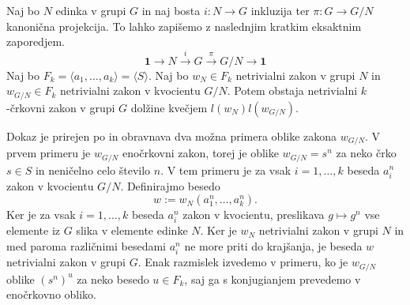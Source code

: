 \begin{lema}\label{lem_razsiritvena_lema}
    Naj bo $N$ edinka v grupi $G$ in naj bosta $i : N \to G$ inkluzija ter $\pi : G \to G / N$ kanonična projekcija. To lahko zapišemo z naslednjim kratkim eksaktnim zaporedjem. \begin{equation*}
        \mathbf{1} \to N \xrightarrow{i} G \xrightarrow{\pi} G / N \to  \mathbf{1}  
    \end{equation*}  
    Naj bo $F_k = \langle a_1, \ldots, a_k \rangle  = \langle S \rangle$. Naj bo $w_N \in F_k$ netrivialni zakon v grupi $N$ in $w_{ G / N} \in  F_k$ netrivialni zakon v kvocientu $G / N$. 
    Potem obstaja netrivialni $k$-črkovni zakon v grupi $G$ dolžine kvečjem $l(w_N) l( w_{ G / N } )$.
\end{lema}
\begin{dokaz}
    Dokaz je prirejen po \cite[str.~10]{Schneider_2016} in obravnava dva možna primera oblike zakona $w_{ G / N }$. 
     V prvem primeru je $w_{ G / N }$ enočrkovni zakon, torej je oblike $w_{G / N} = s^{n}$ za neko črko $s \in S$ in neničelno celo število $n$. V tem primeru je za vsak $i = 1, \ldots, k$ beseda $a_i^n$ zakon v kvocientu $G / N$. Definirajmo besedo \begin{equation*}
        w := w_N(a_1^{n}, \ldots, a_{k}^{n}).
        \end{equation*}  
        Ker je za vsak $i = 1, \ldots, k$ beseda $a_i^n$ zakon v kvocientu, preslikava $g \mapsto g^n$ vse elemente iz $G$ slika v elemente edinke $N$. Ker je $w_N$ netrivialni zakon v grupi $N$ in med paroma različnimi besedami $a_i^n$ ne more priti do krajšanja,
        je beseda $w$ netrivialni zakon v grupi $G$. Enak razmislek izvedemo v primeru, ko je $w_{ G / N }$ oblike $(s^{n})^u$ za neko besedo $u \in F_k$, saj ga s konjugianjem prevedemo v enočrkovno obliko.
        

\end{dokaz}
